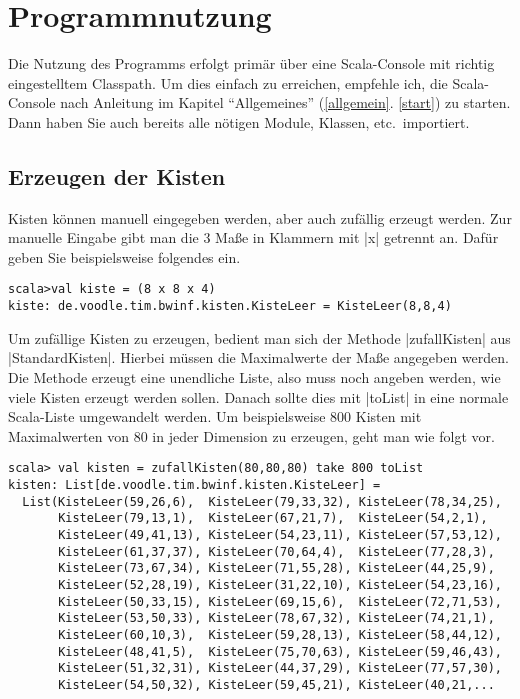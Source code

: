 \section{Programmnutzung}
\lstset{basicstyle=\ttfamily}
Die Nutzung des Programms erfolgt primär über eine Scala-Console mit richtig eingestelltem Classpath.
Um dies einfach zu erreichen, empfehle ich, die Scala-Console nach Anleitung im Kapitel ``Allgemeines'' (\ref{allgemein}. \ref{start}) zu starten.
Dann haben Sie auch bereits alle nötigen Module, Klassen, etc.\ importiert.

\subsection{Erzeugen der Kisten}
Kisten können manuell eingegeben werden, aber auch zufällig erzeugt werden.
Zur manuelle Eingabe gibt man die 3 Maße in Klammern mit |x| getrennt an.
Dafür geben Sie beispielsweise folgendes ein.
\begin{lstlisting}
scala>val kiste = (8 x 8 x 4)
kiste: de.voodle.tim.bwinf.kisten.KisteLeer = KisteLeer(8,8,4)

\end{lstlisting}
Um zufällige Kisten zu erzeugen, bedient man sich der Methode |zufallKisten| aus |StandardKisten|.
Hierbei müssen die Maximalwerte der Maße angegeben werden.
Die Methode erzeugt eine unendliche Liste, also muss noch angeben werden, wie viele Kisten erzeugt werden sollen.
Danach sollte dies mit |toList| in eine normale Scala-Liste umgewandelt werden.
Um beispielsweise 800 Kisten mit Maximalwerten von 80 in jeder Dimension zu erzeugen, geht man wie folgt vor.
\begin{lstlisting}
scala> val kisten = zufallKisten(80,80,80) take 800 toList
kisten: List[de.voodle.tim.bwinf.kisten.KisteLeer] =
  List(KisteLeer(59,26,6),  KisteLeer(79,33,32), KisteLeer(78,34,25),
       KisteLeer(79,13,1),  KisteLeer(67,21,7),  KisteLeer(54,2,1),
       KisteLeer(49,41,13), KisteLeer(54,23,11), KisteLeer(57,53,12),
       KisteLeer(61,37,37), KisteLeer(70,64,4),  KisteLeer(77,28,3),
       KisteLeer(73,67,34), KisteLeer(71,55,28), KisteLeer(44,25,9),
       KisteLeer(52,28,19), KisteLeer(31,22,10), KisteLeer(54,23,16),
       KisteLeer(50,33,15), KisteLeer(69,15,6),  KisteLeer(72,71,53),
       KisteLeer(53,50,33), KisteLeer(78,67,32), KisteLeer(74,21,1),
       KisteLeer(60,10,3),  KisteLeer(59,28,13), KisteLeer(58,44,12),
       KisteLeer(48,41,5),  KisteLeer(75,70,63), KisteLeer(59,46,43),
       KisteLeer(51,32,31), KisteLeer(44,37,29), KisteLeer(77,57,30),
       KisteLeer(54,50,32), KisteLeer(59,45,21), KisteLeer(40,21,...
\end{lstlisting}
